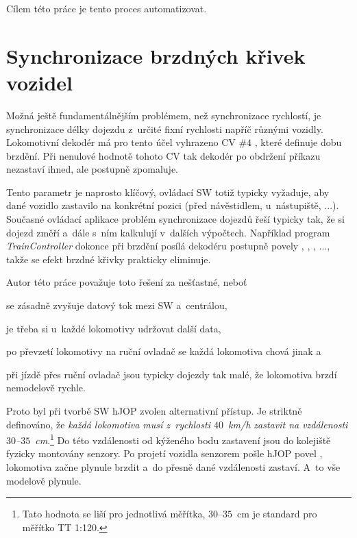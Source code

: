 Cílem této práce je tento proces automatizovat.

\section{Synchronizace brzdných křivek vozidel}
\label{sec:sync-krivky}

Možná ještě fundamentálnějším problémem, než synchronizace rychlostí, je
synchronizace délky dojezdu z~určité fixní rychlosti napříč různými vozidly.
Lokomotivní dekodér má pro tento účel vyhrazeno \gls{CV} $\#4$ \cite{zimo:cvs},
které definuje dobu brzdění. Při nenulové hodnotě tohoto \gls{CV} tak dekodér
po obdržení příkazu  nezastaví ihned, ale postupně zpomaluje.

Tento parametr je naprosto klíčový, ovládací SW totiž typicky vyžaduje, aby
dané vozidlo zastavilo na konkrétní pozici (před návěstidlem, u~nástupiště,
...).  Současné ovládací aplikace problém synchronizace dojezdů řeší typicky
tak, že si dojezd změří a~dále s~ním kalkulují v~dalších výpočtech. Například
program \textit{TrainController} \cite{traincontroller:web} dokonce při brzdění
posílá dekodéru postupně povely , ,
, ..., takže se efekt brzdné křivky prakticky eliminuje.

Autor této práce považuje toto řešení za nešťastné, neboť
\begin{compactenum}
\item se zásadně zvyšuje datový tok mezi SW a~centrálou,
\item je třeba si u~každé lokomotivy udržovat další data,
\item po převzetí lokomotivy na ruční ovladač se každá lokomotiva chová jinak a
\item při jízdě přes ruční ovladač jsou typicky dojezdy tak malé, že lokomotiva
      brzdí nemodelově rychle.
\end{compactenum}

Proto byl při tvorbě SW hJOP zvolen alternativní přístup. Je striktně
definováno, že \textit{každá lokomotiva musí z~rychlosti $40$~km/h zastavit na
vzdálenosti $30$\mbox{--}$35$~cm}.\footnote{Tato hodnota se liší pro jednotlivá
měřítka, $30$\mbox{--}$35$~cm je standard pro měřítko TT 1:120.} Do této
vzdálenosti od kýženého bodu zastavení jsou do kolejiště fyzicky montovány
senzory. Po projetí vozidla senzorem pošle hJOP povel , lokomotiva začne plynule brzdit a~do přesně dané vzdálenosti
zastaví. A~to vše modelově plynule.

